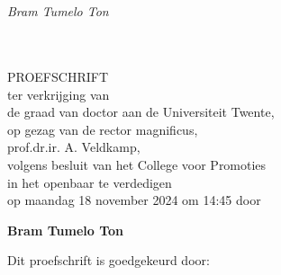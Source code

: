 \begin{titlingpage}
\begin{center}
	\vspace*{2cm} %
	\textbf{\huge{\MakeTextUppercase\thetitle}}\\
	\vspace{0.5cm}
	\large{\MakeTextUppercase\thesubtitle}\\
	\vspace{4cm}
	\textit{\LARGE{Bram Tumelo Ton}}
\end{center}
\end{titlingpage}

\begin{titlingpage}
\begin{center}
	\vspace*{2cm} %
	\textbf{\huge{\MakeTextUppercase\thetitle}}\\
	\vspace{0.5cm}
	\large{\MakeTextUppercase\thesubtitle}\\
	\vfill
	\large{PROEFSCHRIFT}\\
	\vfill
	ter verkrijging van\\
	de graad van doctor aan de Universiteit Twente,\\
	op gezag van de rector magnificus,\\
	prof.dr.ir. A. Veldkamp,\\
	volgens besluit van het College voor Promoties\\
	in het openbaar te verdedigen\\
	op maandag 18 november 2024 om 14:45
	\vfill
	door
	\vspace{0.5cm}
	
	\textbf{\large{Bram Tumelo Ton}}
\end{center}
\newpage
\raggedright
Dit proefschrift is goedgekeurd door:\\[1.5\baselineskip]
    

\end{titlingpage}
